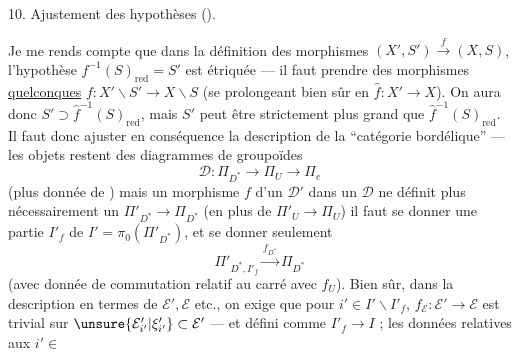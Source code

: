 

10. Ajustement des hypothèses ().

Je me rends compte que dans la définition des morphismes $(X',S')\xrightarrow{f}(X,S)$, l'hypothèse $f^{-1}(S)_{\mathrm{red}}=S'$ est étriquée --- il faut prendre des morphismes \uline{quelconques} $f:X'\backslash S'\to X\backslash S$ (se prolongeant bien sûr en $\widehat{f}:X'\to X$).
On aura donc $S'\supset\widehat{f}^{-1}(S)_{\mathrm{red}}$, mais $S'$ peut être strictement plus grand que $\widehat{f}^{-1}(S)_{\mathrm{red}}$.
Il faut donc ajuster en conséquence la description de la ``catégorie bordélique'' --- les objets restent des diagrammes de groupoïdes
\[
\mathcal{D}:\Pi_{D^*}\to\Pi_U\to\Pi_e
\]
(plus donnée de ) mais un morphisme $f$ d'un $\mathcal{D}'$ dans un $\mathcal{D}$ ne définit plus nécessairement un $\Pi'_{D^*}\to\Pi_{D^*}$ (en plus de $\Pi'_U\to\Pi_U$) il faut se donner une partie $I'_f$ de $I'=\pi_0(\Pi'_{D^*})$, et se donner seulement
\[
\Pi'_{D^*,I'_f}\xrightarrow{f_{D^*}}\Pi_{D^*}
\]
(avec donnée de commutation  relatif au carré avec $f_U$).
Bien sûr, dans la description en termes de $\mathcal{E}',\mathcal{E}$ etc., on exige que pour $i'\in I'\backslash I'_f$, $f_{\mathcal{E}}:\mathcal{E}'\to\mathcal{E}$ est trivial sur $\unsure{\mathcal{E}'_{i'}|\xi'_{i'}}\subset\mathcal{E}'$ --- et  défini comme $I'_f\to I$ ; les données relatives aux $i'\in$

